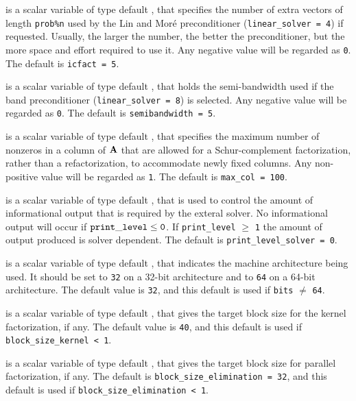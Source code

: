 \documentclass{galahad}
\begin{document}
\begin{description}
 is a scalar variable of type default \integer, that specifies
the number of extra vectors of length {\tt prob\%n} used by the Lin and
Mor\'{e} preconditioner ({\tt linear\_solver = 4}) if requested.
Usually, the larger the number, the
better the preconditioner, but the more space and effort required to
use it. Any negative value will be regarded as {\tt 0}.
The default is {\tt icfact = 5}.

 is a scalar variable of type default \integer, that holds
the semi-bandwidth used if the band preconditioner ({\tt linear\_solver = 8})
is selected. Any negative value will be regarded as {\tt 0}.
The default is {\tt semibandwidth = 5}.

 is a scalar variable of type default \integer, that specifies
the maximum number of nonzeros in a column of ${\mathbf{A}}$ that are allowed
for a Schur-complement factorization, rather than a refactorization, 
to accommodate newly fixed columns.
Any non-positive value will be regarded as {\tt 1}.
The default is {\tt max\_col = 100}.















 is a scalar variable of type default \integer,
that is used
to control the amount of informational output that is required by the exteral
solver. No
informational output will occur if ${\tt print\_level} \leq {\tt 0}$. If
{\tt print\_level} $\geq$ {\tt 1} the amount of output produced is solver
dependent.
The default is {\tt print\_level\_solver = 0}.

 is a scalar variable of type default \integer,
that indicates the machine architecture being used.
It should be set to {\tt 32} on a  32-bit architecture and to {\tt 64}
on a 64-bit architecture. The default value is {\tt 32},
and this default is used if {\tt bits} $\neq$ {\tt 64}.

 is a scalar variable of type default \integer,
that gives the target block size for the kernel factorization, if any.
The default value is {\tt 40},
and this default is used if {\tt block\_size\_kernel < 1}.

 is a scalar variable of type default \integer,
that gives the target block size for parallel factorization, if any.
The default is {\tt block\_size\_elimination = 32},
and this default is used if {\tt block\_size\_\-elimination < 1}.


\end{description}
\end{document}
